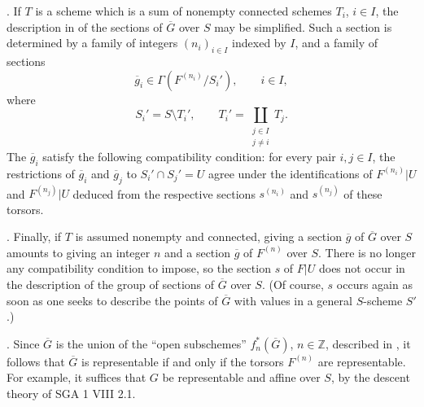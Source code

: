 \medskip
\noindent {}.  If $T$ is a scheme which is a sum of nonempty connected
schemes $T_i$, $i\in I$, the description in  of the sections of
$\overline G$ over $S$ may be simplified.  Such a section is determined by
a family of integers $(n_i)_{i\in I}$ indexed by $I$, and a family of
sections
\[
 \overline g_i\in\Gamma(F^{(n_i)}/S_i'),\qquad i\in I,
\]
where
\[
 S_i'=S\setminus T_i',
 \qquad
 T_i'=\coprod_{\substack{j\in I\\j\ne i}}T_j.
\]
The $\overline g_i$ satisfy the following compatibility condition: for every
pair $i,j\in I$, the restrictions of $\overline g_i$ and $\overline g_j$ to
$S_i'\cap S_j'=U$ agree under the identifications of $F^{(n_i)}|U$ and
$F^{(n_j)}|U$ deduced from the respective sections $s^{(n_i)}$ and
$s^{(n_j)}$ of these torsors.

\medskip
\noindent {}.  Finally, if $T$ is assumed nonempty and connected, giving a
section $\overline g$ of $\overline G$ over $S$ amounts to giving an integer
$n$ and a section $\overline g$ of $F^{(n)}$ over $S$.  There is no longer
any compatibility condition to impose, so the section $s$ of $F|U$ does not
occur in the description of the group of sections of $\overline G$ over
$S$.  (Of course, $s$ occurs again as soon as one seeks to describe the
points of $\overline G$ with values in a general $S$-scheme $S'$.)

\medskip
\noindent {}.  Since $\overline G$ is the union of the ``open
subschemes'' $f_n^*(\overline G)$, $n\in\mathbb Z$, described in , it
follows that $\overline G$ is representable if and only if the torsors
$F^{(n)}$ are representable.  For example, it suffices that $G$ be
representable and affine over $S$, by the descent theory of SGA 1 VIII 2.1.
